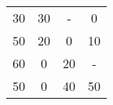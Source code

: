 \begin{tabular}{cccc}
30     & 30     & -      & 0 \\
50     & 20     & 0      & 10 \\
60     & 0      & 20     & - \\
50     & 0      & 40     & 50 \bigstrut[b]\\
\hline
\hline
\end{tabular}%
